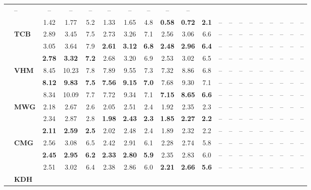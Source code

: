 \begin{table}[!t]
\begin{tabular*}{\textwidth}{@{\extracolsep{\fill}}llccc|ccc|ccc|ccc|ccc|ccc@{}}
  & -- & -- & -- & -- & -- & -- & -- & -- & -- \\
& 
  & 1.42 & 1.77 & 5.2 & 1.33 & 1.65 & 4.8 & \textbf{0.58} & \textbf{0.72} & \textbf{2.1}
  & -- & -- & -- & -- & -- & -- & -- & -- & -- \\
& \multirow{3}{*}{\textbf{TCB}} 
  & 2.89 & 3.45 & 7.5 & 2.73 & 3.26 & 7.1 & 2.56 & 3.06 & 6.6
  & -- & -- & -- & -- & -- & -- & -- & -- & -- \\
& 
  & 3.05 & 3.64 & 7.9 & \textbf{2.61} & \textbf{3.12} & \textbf{6.8} & \textbf{2.48} & \textbf{2.96} & \textbf{6.4}
  & -- & -- & -- & -- & -- & -- & -- & -- & -- \\
& 
  & \textbf{2.78} & \textbf{3.32} & \textbf{7.2} & 2.68 & 3.20 & 6.9 & 2.53 & 3.02 & 6.5
  & -- & -- & -- & -- & -- & -- & -- & -- & -- \\
& \multirow{3}{*}{\textbf{VHM}} 
  & 8.45 & 10.23 & 7.8 & 7.89 & 9.55 & 7.3 & 7.32 & 8.86 & 6.8
  & -- & -- & -- & -- & -- & -- & -- & -- & -- \\
& 
  & \textbf{8.12} & \textbf{9.83} & \textbf{7.5} & \textbf{7.56} & \textbf{9.15} & \textbf{7.0} & 7.68 & 9.30 & 7.1
  & -- & -- & -- & -- & -- & -- & -- & -- & -- \\
& 
  & 8.34 & 10.09 & 7.7 & 7.72 & 9.34 & 7.1 & \textbf{7.15} & \textbf{8.65} & \textbf{6.6}
  & -- & -- & -- & -- & -- & -- & -- & -- & -- \\
& \multirow{3}{*}{\textbf{MWG}} 
  & 2.18 & 2.67 & 2.6 & 2.05 & 2.51 & 2.4 & 1.92 & 2.35 & 2.3
  & -- & -- & -- & -- & -- & -- & -- & -- & -- \\
& 
  & 2.34 & 2.87 & 2.8 & \textbf{1.98} & \textbf{2.43} & \textbf{2.3} & \textbf{1.85} & \textbf{2.27} & \textbf{2.2}
  & -- & -- & -- & -- & -- & -- & -- & -- & -- \\
& 
  & \textbf{2.11} & \textbf{2.59} & \textbf{2.5} & 2.02 & 2.48 & 2.4 & 1.89 & 2.32 & 2.2
  & -- & -- & -- & -- & -- & -- & -- & -- & -- \\
& \multirow{3}{*}{\textbf{CMG}} 
  & 2.56 & 3.08 & 6.5 & 2.42 & 2.91 & 6.1 & 2.28 & 2.74 & 5.8
  & -- & -- & -- & -- & -- & -- & -- & -- & -- \\
& 
  & \textbf{2.45} & \textbf{2.95} & \textbf{6.2} & \textbf{2.33} & \textbf{2.80} & \textbf{5.9} & 2.35 & 2.83 & 6.0
  & -- & -- & -- & -- & -- & -- & -- & -- & -- \\
& 
  & 2.51 & 3.02 & 6.4 & 2.38 & 2.86 & 6.0 & \textbf{2.21} & \textbf{2.66} & \textbf{5.6}
  & -- & -- & -- & -- & -- & -- & -- & -- & -- \\
& \multirow{3}{*}{\textbf{KDH}} 

\end{tabular*}
\end{table}
